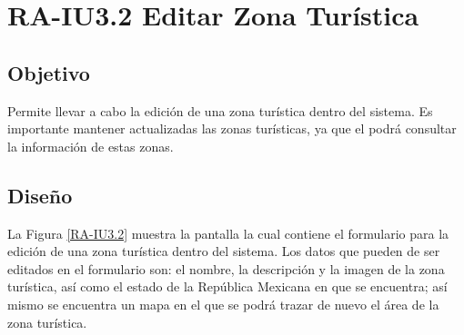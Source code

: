 \newpage
\section{RA-IU3.2 Editar Zona Turística}

\subsection{Objetivo}
Permite llevar a cabo la edición de una zona turística dentro del sistema. Es importante mantener actualizadas las zonas turísticas, ya que el  podrá consultar la información de estas zonas.

\subsection{Diseño}
La Figura \ref{RA-IU3.2} muestra la pantalla  la cual contiene el formulario para la edición de una zona turística dentro del sistema. Los datos que pueden de ser editados en el formulario son: el nombre, la descripción y la imagen de la zona turística, así como el estado de la República Mexicana en que se encuentra; así mismo se encuentra un mapa en el que se podrá trazar de nuevo el área de la zona turística.

